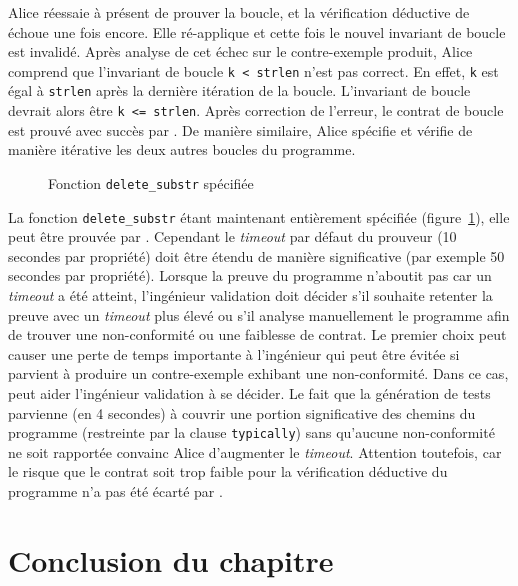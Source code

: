 Alice réessaie à présent de prouver la boucle, et la vérification déductive de
\Wp échoue une fois encore.
Elle ré-applique \NCD et cette fois le nouvel invariant de boucle est invalidé.
Après analyse de cet échec sur le contre-exemple produit, Alice comprend que
l'invariant de boucle \lstinline{k < strlen} n'est pas correct.
En effet, \lstinline{k} est égal à \lstinline{strlen} après la dernière
itération de la boucle.
L'invariant de boucle devrait alors être \lstinline{k <= strlen}.
Après correction de l'erreur, le contrat de boucle est prouvé avec succès par
\Wp.
De manière similaire, Alice spécifie et vérifie de manière itérative les deux
autres boucles du programme.

\begin{figure}[t]
  
  \vspace{-3mm}
  \caption{Fonction \lstinline{delete_substr} spécifiée}
  \vspace{-3mm}
  \label{lst:delete-substr-full}
\end{figure}

La fonction \lstinline{delete_substr} étant maintenant entièrement spécifiée
(figure~\ref{lst:delete-substr-full}), elle peut être prouvée par \Wp.
Cependant le {\em timeout} par défaut du prouveur (10 secondes par propriété)
doit être étendu de manière significative (par exemple 50 secondes par
propriété).
Lorsque la preuve du programme n'aboutit pas car un {\em timeout} a été atteint,
l'ingénieur validation doit décider s'il souhaite retenter la preuve avec
un {\em timeout} plus élevé ou s'il analyse manuellement le programme afin de
trouver une non-conformité ou une faiblesse de contrat.
Le premier choix peut causer une perte de temps importante à l'ingénieur qui
peut être évitée si \NCD parvient à produire un contre-exemple exhibant une
non-conformité.
Dans ce cas, \NCD peut aider l'ingénieur validation à se décider.
Le fait que la génération de tests parvienne (en 4 secondes) à couvrir une
portion significative des chemins du programme (restreinte par la clause
\lstinline'typically') sans qu'aucune non-conformité ne soit rapportée convainc
Alice d'augmenter le {\em timeout}.
Attention toutefois, car le risque que le contrat soit trop faible pour la
vérification déductive du programme n'a pas été écarté par \NCD.


\section*{Conclusion du chapitre}



